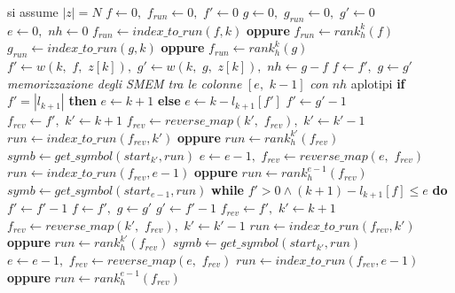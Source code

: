 \begin{algorithm}
  \footnotesize
  \begin{algorithmic}[1]
    \Comment si assume $|z|=N$
    \State $f\gets 0,\,\,f_{run}\gets 0,\,\,f'\gets 0$
    \State $g\gets 0,\,\,g_{run}\gets 0,\,\,g'\gets 0$
    \State $e\gets 0,\,\,nh\gets 0$
    \For {\textit{every} $k\in\left[0,\,\, |z|\right)$}
    \State $f_{run}\gets index\_to\_run(f,k)$ \textbf{oppure} $f_{run}\gets
    rank_h^k(f)$ 
    \State $g_{run}\gets index\_to\_run(g,k)$ \textbf{oppure} $f_{run}\gets
    rank_h^k(g)$ 
    \State $f'\gets w(k,\,\, f,\,\, z[k]),\,\,g'\gets w(k,\,\,
    g,\,\, z[k]),\,\,nh\gets g-f$
    \State $f\gets f',\,\,g\gets g'$
    \Else
    \State \textit{memorizzazione degli SMEM tra le colonne} $[e,\,\, k-1]$
    \textit{con} $nh$ aplotipi
    \EndIf
    \State \textbf{if} $f'=|l_{k+1}|$ \textbf{then} $e\gets k+1$ \textbf{else}
    $e\gets k-l_{k+1}[f']$ 
    \State $f'\gets g'-1$
    \State $f_{rev}\gets f',\,\,k'\gets k+1$
    \State  $f_{rev}\gets reverse\_map(k',\,\,f_{rev}),\,\,k'\gets k'-1$
    \EndWhile
    \State $run\gets index\_to\_run(f_{rev},k')$ \textbf{oppure} $run\gets
    rank_h^{k'}(f_{rev})$
    \State $symb\gets get\_symbol(start_{k'}, run)$ 
    \State $e\gets e-1,\,\,f_{rev}\gets reverse\_map(e, \,\,f_{rev})$
    \State $run\gets index\_to\_run(f_{rev}, e-1)$ \textbf{oppure} $run\gets
    rank_h^{e-1}(f_{rev})$
    \State $symb\gets get\_symbol(start_{e-1}, run)$ 
    \EndWhile
    \EndIf
    \State \textbf{while} $f'>0\land (k+1)-l_{k+1}[f]\leq e$ \textbf{do}
    $f'\gets f'-1$ 
    \State $f\gets f',\,\,g\gets g'$
    \Else
    \State $g'\gets f'-1$
    \State $f_{rev}\gets f',\,\,k'\gets k+1$
    \State  $f_{rev}\gets reverse\_map(k',\,\,f_{rev}),\,\,k'\gets k'-1$
    \EndWhile
    \State $run\gets index\_to\_run(f_{rev},k')$ \textbf{oppure} $run\gets
    rank_h^{k'}(f_{rev})$
    \State $symb\gets
    get\_symbol(start_{k'}, 
    run)$ 
    \State $e\gets e-1,\,\,f_{rev}\gets reverse\_map(e, \,\,f_{rev})$
    \State $run\gets index\_to\_run(f_{rev},e-1)$ \textbf{oppure} $run\gets
    rank_h^{e-1}(f_{rev})$

\end{algorithmic}
\end{algorithm}
